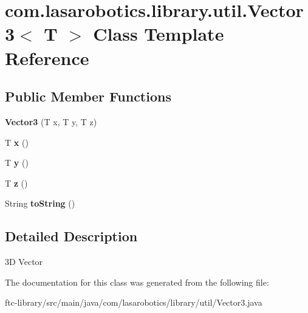 \hypertarget{classcom_1_1lasarobotics_1_1library_1_1util_1_1_vector3}{}\section{com.\+lasarobotics.\+library.\+util.\+Vector3$<$ T $>$ Class Template Reference}
\label{classcom_1_1lasarobotics_1_1library_1_1util_1_1_vector3}
\subsection*{Public Member Functions}
\begin{DoxyCompactItemize}
\item 
\hypertarget{classcom_1_1lasarobotics_1_1library_1_1util_1_1_vector3_a1b15dc67ca04b25408bffacd6e645e73}{}{\bfseries Vector3} (T x, T y, T z)\label{classcom_1_1lasarobotics_1_1library_1_1util_1_1_vector3_a1b15dc67ca04b25408bffacd6e645e73}

\item 
\hypertarget{classcom_1_1lasarobotics_1_1library_1_1util_1_1_vector3_a13960e62b2d008a0def25e8e00cce109}{}T {\bfseries x} ()\label{classcom_1_1lasarobotics_1_1library_1_1util_1_1_vector3_a13960e62b2d008a0def25e8e00cce109}

\item 
\hypertarget{classcom_1_1lasarobotics_1_1library_1_1util_1_1_vector3_a1010b92136212a85494a675a745c714b}{}T {\bfseries y} ()\label{classcom_1_1lasarobotics_1_1library_1_1util_1_1_vector3_a1010b92136212a85494a675a745c714b}

\item 
\hypertarget{classcom_1_1lasarobotics_1_1library_1_1util_1_1_vector3_a6c2e9d6d938e8d826dfc8b3971080f05}{}T {\bfseries z} ()\label{classcom_1_1lasarobotics_1_1library_1_1util_1_1_vector3_a6c2e9d6d938e8d826dfc8b3971080f05}

\item 
\hypertarget{classcom_1_1lasarobotics_1_1library_1_1util_1_1_vector3_a1600528604c240dff24fb4551b8510c2}{}String {\bfseries to\+String} ()\label{classcom_1_1lasarobotics_1_1library_1_1util_1_1_vector3_a1600528604c240dff24fb4551b8510c2}

\end{DoxyCompactItemize}


\subsection{Detailed Description}
3\+D Vector 

The documentation for this class was generated from the following file\+:\begin{DoxyCompactItemize}
\item 
ftc-\/library/src/main/java/com/lasarobotics/library/util/Vector3.\+java\end{DoxyCompactItemize}
